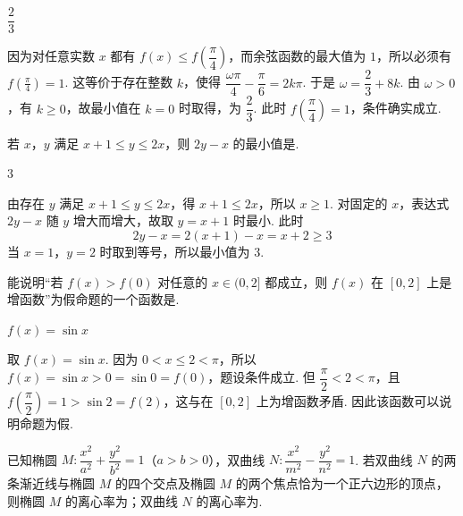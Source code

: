 \begin{answer}
\(\dfrac23\)
\end{answer}

\begin{solution}
因为对任意实数 \(x\) 都有 \(f(x)\leq f\left(\dfrac\pi4\right)\)，而余弦函数的最大值为 \(1\)，所以必须有
\(f\left(\frac\pi4\right)=1\).
这等价于存在整数 \(k\)，使得
\(\dfrac{\omega\pi}{4}-\dfrac\pi6=2k\pi\).
于是 \(\omega=\dfrac23+8k\). 由 \(\omega>0\)，有 \(k\geq0\)，故最小值在 \(k=0\) 时取得，为 \(\dfrac23\). 此时 \(f\left(\dfrac\pi4\right)=1\)，条件确实成立.
\end{solution}

\begin{problem}
若 \(x\)，\(y\) 满足 \(x+1\le y\le 2x\)，则 \(2y-x\) 的最小值是\fillinblank{}.
\end{problem}

\begin{answer}
3
\end{answer}

\begin{solution}
由存在 \(y\) 满足 \(x+1\leq y\leq2x\)，得 \(x+1\leq2x\)，所以 \(x\geq1\). 对固定的 \(x\)，表达式 \(2y-x\) 随 \(y\) 增大而增大，故取 \(y=x+1\) 时最小. 此时
\[
2y-x=2(x+1)-x=x+2\geq3
\]
当 \(x=1\)，\(y=2\) 时取到等号，所以最小值为 \(3\).
\end{solution}

\begin{problem}
能说明“若 \(f(x)>f(0)\) 对任意的 \(x\in(0,2]\) 都成立，则 \(f(x)\) 在 \([0,2]\) 上是增函数”为假命题的一个函数是\fillinblank{}.
\end{problem}

\begin{answer}
\(f(x)=\sin x\)
\end{answer}

\begin{solution}
取 \(f(x)=\sin x\). 因为 \(0<x\leq2<\pi\)，所以 \(f(x)=\sin x>0=\sin0=f(0)\)，题设条件成立. 但 \(\dfrac\pi2<2<\pi\)，且
\(f\left(\dfrac\pi2\right)=1>\sin2=f(2)\)，这与在 \([0,2]\) 上为增函数矛盾. 因此该函数可以说明命题为假.
\end{solution}

\begin{problem}
已知椭圆 \(M:\dfrac{x^2}{a^2}+\dfrac{y^2}{b^2}=1\)（\(a>b>0\)），双曲线 \(N:\dfrac{x^2}{m^2}-\dfrac{y^2}{n^2}=1\). 若双曲线 \(N\) 的两条渐近线与椭圆 \(M\) 的四个交点及椭圆 \(M\) 的两个焦点恰为一个正六边形的顶点，则椭圆 \(M\) 的离心率为\fillinblank{}；双曲线 \(N\) 的离心率为\fillinblank{}.
\end{problem}

